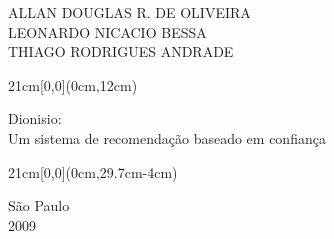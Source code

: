 \begin{center}
  {\large ALLAN DOUGLAS R. DE OLIVEIRA \\
    LEONARDO NICACIO BESSA \\
    THIAGO RODRIGUES ANDRADE}
\end{center}

\begin{textblock*}{21cm}[0,0](0cm,12cm)
  \begin{center}
    {\LARGE Dionisio:\\ Um sistema de recomendação baseado em confiança }
  \end{center}
\end{textblock*}


\begin{textblock*}{21cm}[0,0](0cm,29.7cm-4cm)
  \begin{center}
    {\large São Paulo \\ 2009 }
  \end{center}
\end{textblock*}


